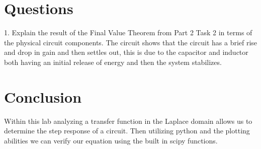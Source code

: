 \documentclass[12pt]{report}
\begin{document}
\section{Questions}
1. Explain the result of the Final Value Theorem from Part 2 Task 2 in terms of the physical
circuit components.\newline
The circuit shows that the circuit has a brief rise and drop in gain and then settles out, this is due to the capacitor and inductor both having an initial release of energy and then the system stabilizes. 

\section{Conclusion}
Within this lab analyzing a transfer function in the Laplace domain allows us to determine the step response of a circuit. Then utilizing python and the plotting abilities we can verify our equation using the built in scipy functions. 

\newpage
\end{document}
